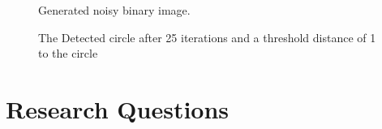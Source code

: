\begin{figure}
	\centering
	\begin{minipage}[t]{0.49\linewidth}
		\centering
		\caption{Generated noisy binary image.}
		\label{BinaryInput}
	\end{minipage}
	\hfill
	\begin{minipage}[t]{0.49\linewidth}
		\centering
		\caption{The Detected circle after 25 iterations and a threshold distance of 1 to the circle}
		\label{CircleResult}
	\end{minipage}
\end{figure}

\section{Research Questions}

